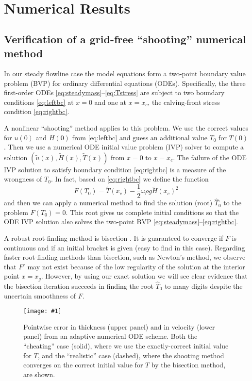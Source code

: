 \documentclass[review,letterpaper]{igs}
\newcommand{\onecol}[1]{\texttt{[image: \#1]}}
\begin{document}
\section{Numerical Results}

\subsection*{Verification of a grid-free ``shooting'' numerical method}  In our steady flowline case the model equations form a two-point boundary value problem (BVP) for ordinary differential equations (ODEs).  Specifically, the three first-order ODEs \eqref{eq:steadymass}--\eqref{eq:Tstress} are subject to two boundary conditions \eqref{eq:leftbc} at $x=0$ and one at $x=x_c$, the calving-front stress condition \eqref{eq:rightbc}.  

A nonlinear ``shooting'' method \citep[section 17.1]{Pressetal} applies to this problem.  We use the correct values for $u(0)$ and $H(0)$ from \eqref{eq:leftbc} and guess an additional value $T_0$ for $T(0)$.  Then we use a numerical ODE initial value problem (IVP) solver to compute a solution $(\tilde u(x),\tilde H(x),\tilde T(x))$ from $x=0$ to $x=x_c$.  The failure of the ODE IVP solution to satisfy boundary condition \eqref{eq:rightbc} is a measure of the wrongness of $T_0$.  In fact, based on \eqref{eq:rightbc} we define the function
\begin{equation}
F(T_0) = \tilde T(x_c) - \frac{1}{2} \omega \rho g \tilde H(x_c)^2  \label{eq:Fbisection}
\end{equation}
and then we can apply a numerical method to find the solution (root) $\hat T_0$ to the problem $F(T_0)=0$.  This root gives us complete initial conditions so that the ODE IVP solution also solves the two-point BVP \eqref{eq:steadymass}--\eqref{eq:rightbc}.

A robust root-finding method is bisection \citep[section 9.1]{Pressetal}.  It is guaranteed to converge if $F$ is continuous and if an initial bracket is given (easy to find in this case).  Regarding faster root-finding methods than bisection, such as Newton's method, we observe that $F'$ may not exist because of the low regularity of the solution at the interior point $x=x_g$. However, by using our exact solution we will see clear evidence that the bisection iteration succeeds in finding the root $\hat T_0$ to many digits despite the uncertain smoothness of $F$.

\begin{figure}[ht]
\onecol{exactmarine-error}
\caption{Pointwise error in thickness (upper panel) and in velocity (lower panel) from an adaptive numerical ODE scheme.  Both the ``cheating'' case (solid), where we use the exactly-correct initial value for $T$, and the ``realistic'' case (dashed), where the shooting method converges on the correct initial value for $T$ by the bisection method, are shown.} \label{fig:shoot-error}
\end{figure}
\end{document}
